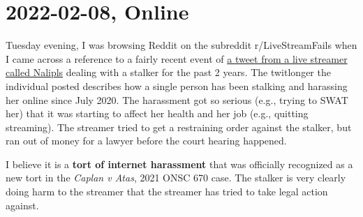 \documentclass[
  coursecode={LAW 201},
  assignmentname={ALS Task: Spot the Tort Diary},
  studentnumber=20053722,
  name={Bryan Hoang},
  draft,
]{
  ltxanswer%
}
\begin{document}
  \section*{2022-02-08, Online}

  Tuesday evening, I was browsing Reddit on the subreddit r/LiveStreamFails when I came across a reference to a fairly recent event of \href{https://twitter.com/nalipls/status/1486528914902159365?s=20&t=dawuAxWiYC1T-ZoCk2uOPQ}{a tweet from a live streamer called Nalipls} dealing with a stalker for the past 2 years. The twitlonger the individual posted describes how a single person has been stalking and harassing her online since July 2020. The harassment got so serious (e.g., trying to SWAT her) that it was starting to affect her health and her job (e.g., quitting streaming). The streamer tried to get a restraining order against the stalker, but ran out of money for a lawyer before the court hearing happened.

  I believe it is a \textbf{tort of internet harassment} that was officially recognized as a new tort in the \textit{Caplan v Atas}, 2021 ONSC 670 case. The stalker is very clearly doing harm to the streamer that the streamer has tried to take legal action against.
\end{document}
